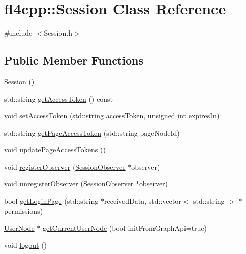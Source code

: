 \hypertarget{classfl4cpp_1_1_session}{}\section{fl4cpp\+:\+:Session Class Reference}
\label{classfl4cpp_1_1_session}


{\ttfamily \#include $<$Session.\+h$>$}

\subsection*{Public Member Functions}
\begin{DoxyCompactItemize}
\item 
\hyperlink{classfl4cpp_1_1_session_ad92ef09b872c9227e38a6efdd4d8a837}{Session} ()
\item 
std\+::string \hyperlink{classfl4cpp_1_1_session_a2306590848980a36ba37c1bbaf9cec34}{get\+Access\+Token} () const 
\item 
void \hyperlink{classfl4cpp_1_1_session_a19916b956cfbe9e4ec5552c959727842}{set\+Access\+Token} (std\+::string access\+Token, unsigned int expires\+In)
\item 
std\+::string \hyperlink{classfl4cpp_1_1_session_a4c8ad57a344f675942f3cf1bb99da7a2}{get\+Page\+Access\+Token} (std\+::string page\+Node\+Id)
\item 
void \hyperlink{classfl4cpp_1_1_session_abdee749e972ecbc8e33608a78e181ae6}{update\+Page\+Access\+Tokens} ()
\item 
void \hyperlink{classfl4cpp_1_1_session_a509344933d13b0194a78d28f657c824a}{register\+Observer} (\hyperlink{classfl4cpp_1_1_session_observer}{Session\+Observer} $\ast$observer)
\item 
void \hyperlink{classfl4cpp_1_1_session_ab2ea95f999ce4c29f89dcad98a5ea33c}{unregister\+Observer} (\hyperlink{classfl4cpp_1_1_session_observer}{Session\+Observer} $\ast$observer)
\item 
bool \hyperlink{classfl4cpp_1_1_session_ab8a9cd8497527ae62470cba1d03cae4b}{get\+Login\+Page} (std\+::string $\ast$received\+Data, std\+::vector$<$ std\+::string $>$ $\ast$permissions)
\item 
\hyperlink{classfl4cpp_1_1_user_node}{User\+Node} $\ast$ \hyperlink{classfl4cpp_1_1_session_aa77c71557a3846ef944004e7524fa41e}{get\+Current\+User\+Node} (bool init\+From\+Graph\+Api=true)
\item 
void \hyperlink{classfl4cpp_1_1_session_ab36eeec3e87afdac72b0df63704a3fbd}{logout} ()
\end{DoxyCompactItemize}


